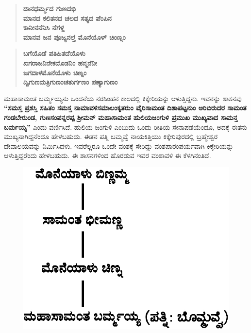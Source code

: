 \begin{verse}
\textbf{ದಾನಧರ್ಮ್ಮದ ಗುಣದಭಿ} \\\textbf{ಮಾನದ ಕಲಿತನದ ಚಲದ ಸತ್ಯದ ಪೆಂಪಿನ} \\\textbf{ಕಾನೀನನೆನಿಸಿ ನೆಗಳ್ದ} \\\textbf{ಮಾನವ ಜನ ಪೂಜ್ಯನಲ್ತೆ ಮೊನೆಯೊಳ್​ ಚಿಂಣ್ನಂ}
\end{verse}

\begin{verse}
\textbf{ಬಗೆಯೊಡೆ ಪತಿಹಿತದೆಯೊಳು} \\\textbf{ಖಗರಾಜನಿನೇಕದೊಡನಿಂ ಹನ್ಮನೆನೀ} \\\textbf{ಜಗದಾಳಮೊನೆಯೊಳು ಚಿಣ್ನಂ} \\\textbf{ದ್ವಿಗುಣಮತ್ರಿಗುಣಂಚತುರ್ಗಣಂ ಪಣ್ಯಾಗುಣಂ}
\end{verse}

ಮಹಾಸಾಮಂತ ಬರ್ಮ್ಮಯ್ಯನು ಒಂದನೆಯ ನರಸಿಂಹನ ಕಾಲದಲ್ಲಿ ಕಿಕ್ಕೇರಿಯನ್ನು ಆಳುತ್ತಿದ್ದನು. ಇವನನ್ನು ಶಾಸನವು \textbf{“ಸಮಸ್ತ ಪ್ರಶಸ್ತಿ ಸಹಿತಂ ಸಮಸ್ತ ನಾಮಾವಳಿಸಮಾಲಂಕೃತರುಂ ವೈರಿಸಾಮಂತ ದಿಶಾಪಟ್ಟನುಂ ಅರಿಬಿರುದರ ಸಾಮಂತ ಗಂಡಬೇರುಂಡ, ಗುಣಸಂಪನ್ನರಪ್ಪ ಶ‍್ರೀಮನ್​ ಮಹಾಸಾಮಂತ ಹುಲಿಯಜಂಗುಳಿ ಪ್ರಮುಖ ಮುಖ್ಯವಾದ ಸಾಮನ್ತ ಬರ್ಮಯ್ಯ” }ಎಂದು ವರ್ಣಿಸಿದೆ. ಹುಲಿಯ ಜಂಗುಳಿ ಎಂಬುದು ಒಂದು ರೀತಿಯ ಸೇನಾಪಡೆಯೆಂದೂ, ಅದಕ್ಕೆ ಈತನು ಮುಖ್ಯನಾಗಿದ್ದನೆಂದೂ ಹೇಳಬಹುದು. ಈತನ ಪತ್ನಿ ಬಮ್ಮವ್ವೆ ನಾಯಕಿತ್ತಿಯು ಕಿಕ್ಕೇರಿಪುರದಲ್ಲಿ ಬ್ರಹ್ಮೇಶ್ವರ ದೇವಾಲಯವನ್ನು ನಿರ್ಮಿಸಿದಳು. ಇವರೆಲ್ಲರೂ ಒಂದೇ ವಂಶಕ್ಕೆ ಸೇರಿದ್ದು ವಂಶಪಾರಂಪರ್ಯವಾಗಿ ಕಿಕ್ಕೇರಿಯನ್ನು ಆಳುತ್ತಿದ್ದರೆಂದು ಹೇಳಬಹುದು. ಈ ಶಾಸನಗಳಿಂದ ಹೊರಡುವ ಇವರ ವಂಶಾವಳಿ ಈ ಕೆಳಗಿನಂತಿದೆ.

\begin{figure}[H]
\includegraphics[scale=1.22]{images/chap3/chap3fig5.jpeg}
\end{figure}

